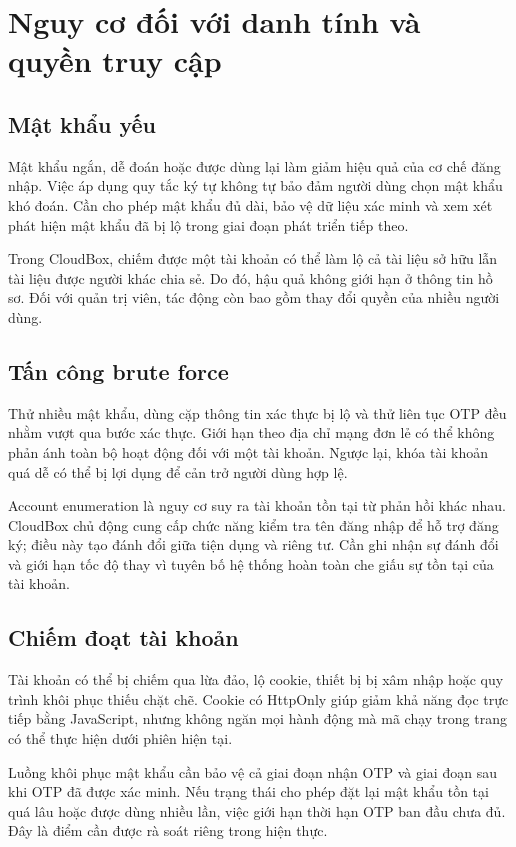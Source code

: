 \section{Nguy cơ đối với danh tính và quyền truy cập}
\subsection{Mật khẩu yếu}
Mật khẩu ngắn, dễ đoán hoặc được dùng lại làm giảm hiệu quả của cơ chế đăng nhập. Việc áp dụng quy tắc ký tự không tự bảo đảm người dùng chọn mật khẩu khó đoán. Cần cho phép mật khẩu đủ dài, bảo vệ dữ liệu xác minh và xem xét phát hiện mật khẩu đã bị lộ trong giai đoạn phát triển tiếp theo.

Trong CloudBox, chiếm được một tài khoản có thể làm lộ cả tài liệu sở hữu lẫn tài liệu được người khác chia sẻ. Do đó, hậu quả không giới hạn ở thông tin hồ sơ. Đối với quản trị viên, tác động còn bao gồm thay đổi quyền của nhiều người dùng.
\subsection{Tấn công brute force}
Thử nhiều mật khẩu, dùng cặp thông tin xác thực bị lộ và thử liên tục OTP đều nhằm vượt qua bước xác thực. Giới hạn theo địa chỉ mạng đơn lẻ có thể không phản ánh toàn bộ hoạt động đối với một tài khoản. Ngược lại, khóa tài khoản quá dễ có thể bị lợi dụng để cản trở người dùng hợp lệ.

Account enumeration là nguy cơ suy ra tài khoản tồn tại từ phản hồi khác nhau. CloudBox chủ động cung cấp chức năng kiểm tra tên đăng nhập để hỗ trợ đăng ký; điều này tạo đánh đổi giữa tiện dụng và riêng tư. Cần ghi nhận sự đánh đổi và giới hạn tốc độ thay vì tuyên bố hệ thống hoàn toàn che giấu sự tồn tại của tài khoản.
\subsection{Chiếm đoạt tài khoản}
Tài khoản có thể bị chiếm qua lừa đảo, lộ cookie, thiết bị bị xâm nhập hoặc quy trình khôi phục thiếu chặt chẽ. Cookie có HttpOnly giúp giảm khả năng đọc trực tiếp bằng JavaScript, nhưng không ngăn mọi hành động mà mã chạy trong trang có thể thực hiện dưới phiên hiện tại.

Luồng khôi phục mật khẩu cần bảo vệ cả giai đoạn nhận OTP và giai đoạn sau khi OTP đã được xác minh. Nếu trạng thái cho phép đặt lại mật khẩu tồn tại quá lâu hoặc được dùng nhiều lần, việc giới hạn thời hạn OTP ban đầu chưa đủ. Đây là điểm cần được rà soát riêng trong hiện thực.
